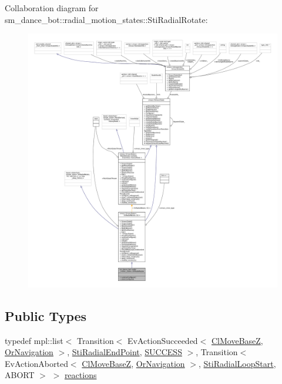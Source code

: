 Collaboration diagram for sm\+\_\+dance\+\_\+bot\+:\+:radial\+\_\+motion\+\_\+states\+:\+:Sti\+Radial\+Rotate\+:
\nopagebreak
\begin{figure}[H]
\begin{center}
\leavevmode
\includegraphics[width=350pt]{structsm__dance__bot_1_1radial__motion__states_1_1StiRadialRotate__coll__graph}
\end{center}
\end{figure}
\subsection*{Public Types}
\begin{DoxyCompactItemize}
\item 
typedef mpl\+::list$<$ Transition$<$ Ev\+Action\+Succeeded$<$ \hyperlink{classmove__base__z__client_1_1ClMoveBaseZ}{Cl\+Move\+BaseZ}, \hyperlink{classsm__dance__bot_1_1OrNavigation}{Or\+Navigation} $>$, \hyperlink{structsm__dance__bot_1_1radial__motion__states_1_1StiRadialEndPoint}{Sti\+Radial\+End\+Point}, \hyperlink{classSUCCESS}{S\+U\+C\+C\+E\+SS} $>$, Transition$<$ Ev\+Action\+Aborted$<$ \hyperlink{classmove__base__z__client_1_1ClMoveBaseZ}{Cl\+Move\+BaseZ}, \hyperlink{classsm__dance__bot_1_1OrNavigation}{Or\+Navigation} $>$, \hyperlink{structsm__dance__bot_1_1radial__motion__states_1_1StiRadialLoopStart}{Sti\+Radial\+Loop\+Start}, A\+B\+O\+RT $>$ $>$ \hyperlink{structsm__dance__bot_1_1radial__motion__states_1_1StiRadialRotate_a9a1ffbc6c684c386ecad126451aa45f8}{reactions}
\end{DoxyCompactItemize}
